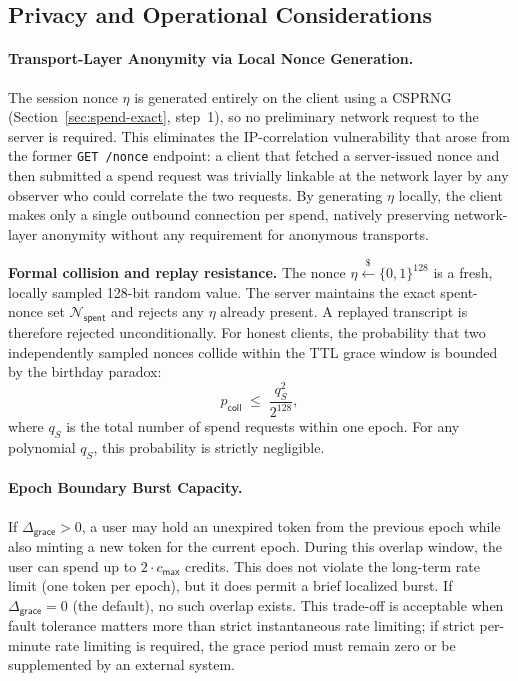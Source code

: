 \documentclass[11pt]{article}
\theoremstyle{definitionstyle}
\theoremstyle{plain}
\begin{document}
\subsection{Privacy and Operational Considerations}

\paragraph{Transport-Layer Anonymity via Local Nonce Generation.}
The session nonce $\eta$ is generated entirely on the client using a CSPRNG (Section~\ref{sec:spend-exact}, step~1), so no preliminary network request to the server is required.  This eliminates the IP-correlation vulnerability that arose from the former \texttt{GET /nonce} endpoint: a client that fetched a server-issued nonce and then submitted a spend request was trivially linkable at the network layer by any observer who could correlate the two requests.  By generating $\eta$ locally, the client makes only a single outbound connection per spend, natively preserving network-layer anonymity without any requirement for anonymous transports.

\textbf{Formal collision and replay resistance.}
The nonce $\eta \xleftarrow{\$} \{0,1\}^{128}$ is a fresh, locally sampled 128-bit random value.  The server maintains the exact spent-nonce set $\mathcal{N}_{\mathsf{spent}}$ and rejects any $\eta$ already present.  A replayed transcript is therefore rejected unconditionally.  For honest clients, the probability that two independently sampled nonces collide within the TTL grace window is bounded by the birthday paradox:
\[
p_{\mathsf{coll}} \;\le\; \frac{q_S^2}{2^{128}},
\]
where $q_S$ is the total number of spend requests within one epoch.  For any polynomial $q_S$, this probability is strictly negligible.

\paragraph{Epoch Boundary Burst Capacity.}
If $\Delta_{\mathsf{grace}} > 0$, a user may hold an unexpired token from the previous epoch while also minting a new token for the current epoch. During this overlap window, the user can spend up to $2 \cdot c_{\mathsf{max}}$ credits. This does not violate the long-term rate limit (one token per epoch), but it does permit a brief localized burst. If $\Delta_{\mathsf{grace}} = 0$ (the default), no such overlap exists. This trade-off is acceptable when fault tolerance matters more than strict instantaneous rate limiting; if strict per-minute rate limiting is required, the grace period must remain zero or be supplemented by an external system.
\end{document}
